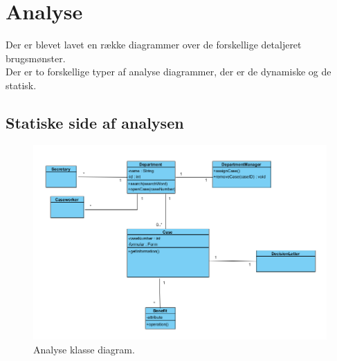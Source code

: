 \section{Analyse}
Der er blevet lavet en række diagrammer over de forskellige detaljeret brugsmønster.\\
Der er to forskellige typer af analyse diagrammer, der er de dynamiske og de statisk.
\subsection{Statiske side af analysen}
\begin{figure}
  \includegraphics[width=\linewidth]{./PNG/analyseKlasseDiagram.PNG} 
  \caption{Analyse klasse diagram.}
  \label{fig:AKlasse}
\end{figure}

